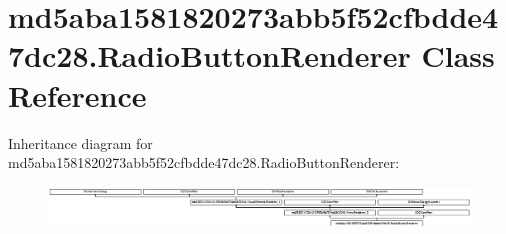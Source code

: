 \hypertarget{classmd5aba1581820273abb5f52cfbdde47dc28_1_1RadioButtonRenderer}{}\section{md5aba1581820273abb5f52cfbdde47dc28.\+Radio\+Button\+Renderer Class Reference}
\label{classmd5aba1581820273abb5f52cfbdde47dc28_1_1RadioButtonRenderer}
Inheritance diagram for md5aba1581820273abb5f52cfbdde47dc28.\+Radio\+Button\+Renderer\+:\begin{figure}[H]
\begin{center}
\leavevmode
\includegraphics[height=1.098039cm]{classmd5aba1581820273abb5f52cfbdde47dc28_1_1RadioButtonRenderer}
\end{center}
\end{figure}
